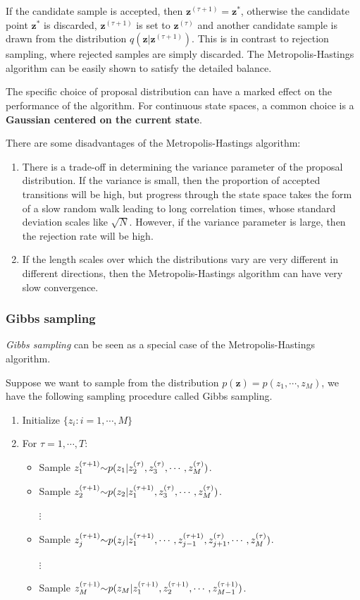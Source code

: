 \documentclass[a4paper]{report}
\newcommand{\wave}{\scriptsize{\sim}}
\renewcommand{\bf}{\mathbf}
\newcommand{\imp}[1]{{\color{blue}\textit{#1}}}
\begin{document}
If the candidate sample is accepted, then $\bf{z}^{(\tau + 1)} = \bf{z}^*$, otherwise the candidate point $\bf{z}^*$ is discarded, $\bf{z}^{(\tau+1)}$ is set to $\bf{z}^{(\tau)}$ and another candidate sample is drawn from the distribution $q(\bf{z}|\bf{z}^{(\tau+1)})$. This is in contrast to rejection sampling, where rejected samples are simply discarded. The Metropolis-Hastings algorithm can be easily shown to satisfy the detailed balance.

The specific choice of proposal distribution can have a marked effect on the performance of the algorithm. For continuous state spaces, a common choice is a \textbf{Gaussian centered on the current state}.

There are some disadvantages of the Metropolis-Hastings algorithm:
\begin{enumerate}
	\item There is a trade-off in determining the variance parameter of the proposal distribution. If the variance is small, then the proportion of accepted transitions will be high, but progress through the state space takes the form of a slow random walk leading to long correlation times, whose standard deviation scales like $\sqrt{N}$. However, if the variance parameter is large, then the rejection rate will be high.
	\item If the length scales over which the distributions vary are very different in different directions, then the Metropolis-Hastings algorithm can have very slow convergence.
\end{enumerate}
\subsubsection{Gibbs sampling}
\imp{Gibbs sampling} can be seen as a special case of the Metropolis-Hastings algorithm. 

Suppose we want to sample from the distribution $p(\bf{z}) = p(z_1,\cdots,z_M)$, we have the following sampling procedure called Gibbs sampling.
\begin{enumerate}
	\item Initialize $\{ z_i:i=1,\cdots,M \}$
	\item For $\tau = 1,\cdots,T$:
	\begin{itemize}
		\item Sample $z_1^{(\tau+1)} \wave p(z_1|z_2^{(\tau)},z_3^{(\tau)},\cdots,z_M^{(\tau)})$.
		\item Sample $z_2^{(\tau+1)} \wave p(z_2|z_1^{(\tau+1)},z_3^{(\tau)},\cdots,z_M^{(\tau)})$.
		
		$\vdots$
		\item Sample $z_j^{(\tau+1)}\wave p(z_j|z_1^{(\tau+1)},\cdots,z_{j-1}^{(\tau+1)},z_{j+1}^{(\tau)},\cdots,z_M^{(\tau)})$.
		
		$\vdots$
		\item Sample $z_M^{(\tau+1)}\wave p(z_M|z_1^{(\tau+1)},z_2^{(\tau+1)},\cdots,z_{M-1}^{(\tau+1)})$.
	\end{itemize}
\end{enumerate}
\end{document}
